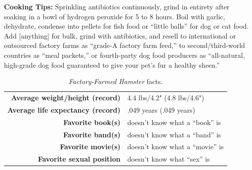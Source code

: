 \documentclass[10pt,twoside,openright]{memoir}
\begin{document}
\vspace{1em}
\noindent
\textbf{Cooking Tips:} Sprinkling antibiotics continuously, grind in entirety
after soaking in a bowl of hydrogen peroxide for 5 to 8 hours. Boil with garlic,
dehydrate, condense into pellets for fish food or ``little balls'' for dog or
cat food. Add [anything] for bulk, grind with antibiotics, and resell to
international or outsourced factory farms as ``grade-A factory farm feed,'' to
second/third-world countries as ``meal packets,'' or fourth-party dog food
producers as ``all-natural, high-grade dog food guaranteed to give your
pet's fur a healthy sheen.''

\begin{table}
\begin{center}
  \small
  \begin{tabular}{rl}
  \textbf{Average weight/height (record)} & 4.4 lbs/4.2" (4.8 lbs/4.6") \\
  \textbf{Average life expectancy (record)} & .049 years (.049 years) \\
  \textbf{Favorite book(s)} & doesn't know what a ``book'' is \\
  \textbf{Favorite band(s)} & doesn't know what a ``band'' is \\
  \textbf{Favorite movie(s)} & doesn't know what a ``movie'' is \\
  \textbf{Favorite sexual position} & doesn't know what ``sex'' is \\
  \end{tabular}
\end{center}
\caption*{{\em Factory-Farmed Hamster} facts.}
\end{table}
\end{document}
